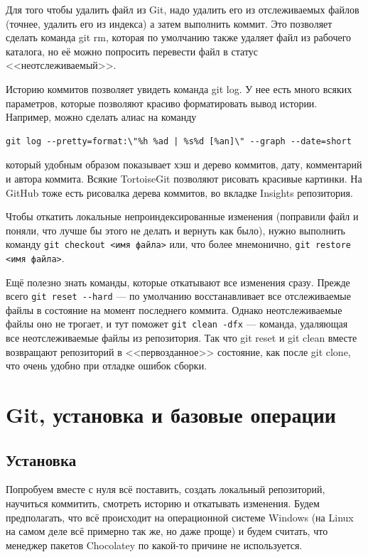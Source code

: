 \documentclass{../text-style}
\begin{document}
Для того чтобы удалить файл из Git, надо удалить его из отслеживаемых файлов (точнее, удалить его из индекса) а затем выполнить коммит. Это позволяет сделать команда git rm, которая по умолчанию также удаляет файл из рабочего каталога, но её можно попросить перевести файл в статус <<неотслеживаемый>>.

Историю коммитов позволяет увидеть команда git log. У нее есть много всяких параметров, которые позволяют красиво форматировать вывод истории. Например, можно сделать алиас на команду 

\begin{verbatim}
git log --pretty=format:\"%h %ad | %s%d [%an]\" --graph --date=short
\end{verbatim}

который удобным образом показывает хэш и дерево коммитов, дату, комментарий и автора коммита. Всякие TortoiseGit позволяют рисовать красивые картинки. На GitHub тоже есть рисовалка дерева коммитов, во вкладке Insights репозитория.

Чтобы откатить локальные непроиндексированные изменения (поправили файл и поняли, что лучше бы этого не делать и вернуть как было), нужно выполнить команду \verb|git checkout <имя файла>| или, что более мнемонично, \verb|git restore <имя файла>|.

Ещё полезно знать команды, которые откатывают все изменения сразу. Прежде всего \verb|git reset --hard| --- по умолчанию восстанавливает все отслеживаемые файлы в состояние на момент последнего коммита. Однако неотслеживаемые файлы оно не трогает, и тут поможет \verb|git clean -dfx| --- команда, удаляющая все неотслеживаемые файлы из репозитория. Так что git reset и git clean вместе возвращают репозиторий в <<первозданное>> состояние, как после git clone, что очень удобно при отладке ошибок сборки.

\section{Git, установка и базовые операции}

\subsection{Установка}

Попробуем вместе с нуля всё поставить, создать локальный репозиторий, научиться коммитить, смотреть историю и откатывать изменения. Будем предполагать, что всё происходит на операционной системе Windows (на Linux на самом деле всё примерно так же, но даже проще) и будем считать, что менеджер пакетов Chocolatey по какой-то причине не используется.
\end{document}
